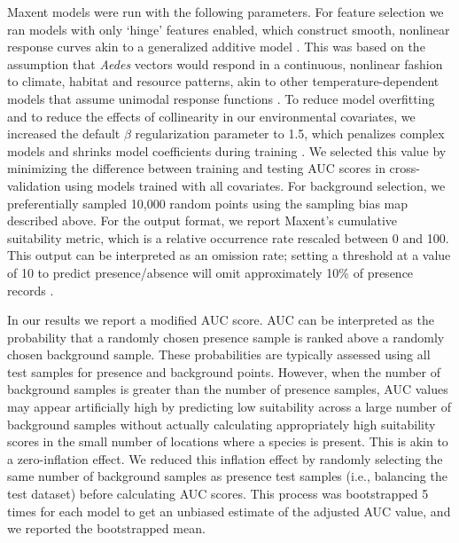 Maxent models were run with the following parameters. For feature selection we ran models with only ‘hinge’ features enabled, which construct smooth, nonlinear response curves akin to a generalized additive model \cite{Hastie2004-bw, Elith2011-kb}. This was based on the assumption that \textit{Aedes} vectors would respond in a continuous, nonlinear fashion to climate, habitat and resource patterns, akin to other temperature-dependent models that assume unimodal response functions \cite{Mordecai2017-tb}. To reduce model overfitting and to reduce the effects of collinearity in our environmental covariates, we increased the default $\beta$ regularization parameter to 1.5, which penalizes complex models and shrinks model coefficients during training \cite{Merow2013-mw}. We selected this value by minimizing the difference between training and testing AUC scores in cross-validation using models trained with all covariates. For background selection, we preferentially sampled 10,000 random points using the sampling bias map described above. For the output format, we report Maxent’s cumulative suitability metric, which is a relative occurrence rate rescaled between 0 and 100. This output can be interpreted as an omission rate; setting a threshold at a value of 10 to predict presence/absence will omit approximately 10\% of presence records \cite{Phillips2008-ic, Merow2013-mw}.

In our results we report a modified AUC score. AUC can be interpreted as the probability that a randomly chosen presence sample is ranked above a randomly chosen background sample. These probabilities are typically assessed using all test samples for presence and background points. However, when the number of background samples is greater than the number of presence samples, AUC values may appear artificially high by predicting low suitability across a large number of background samples without actually calculating appropriately high suitability scores in the small number of locations where a species is present. This is akin to a zero-inflation effect. We reduced this inflation effect by randomly selecting the same number of background samples as presence test samples (i.e., balancing the test dataset) before calculating AUC scores. This process was bootstrapped 5 times for each model to get an unbiased estimate of the adjusted AUC value, and we reported the bootstrapped mean.

